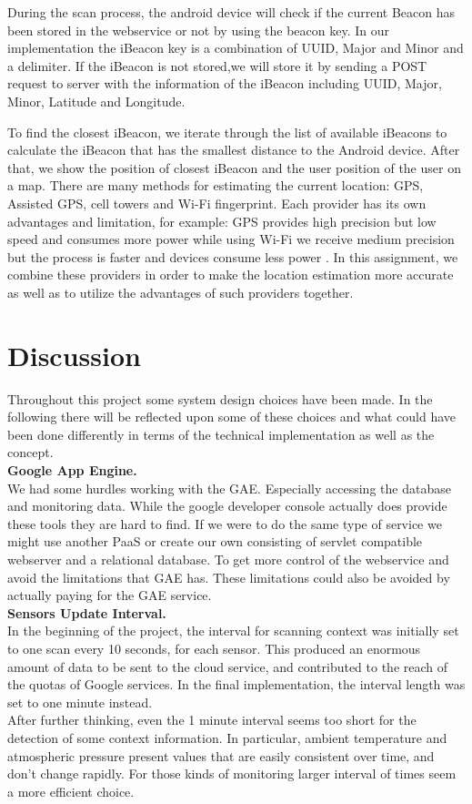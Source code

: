\documentclass{sigchi}
\begin{document}
During the scan process, the android device will check if the current Beacon has been stored in the webservice or not by using the beacon key.
In our implementation the iBeacon key is a combination of UUID, Major and Minor and a delimiter.
If the iBeacon is not stored,we will store it by sending a POST request to server with the information of the iBeacon including UUID, Major, Minor, Latitude and Longitude.

To find the closest iBeacon, we iterate through the list of available iBeacons to calculate the iBeacon that has the smallest distance to the Android device. After that, we show the position of closest iBeacon and the user position of the user on a map.
There are many methods for estimating the current location: GPS, Assisted GPS, cell towers and Wi-Fi fingerprint.
Each provider has its own advantages and limitation, for example: GPS provides high precision but low speed and consumes more power while using Wi-Fi we receive medium precision but the process is faster and devices consume less power \cite{LaMarca:2008:LS, Constandache:2010:TMPLWWD}.
In this assignment, we combine these providers in order to make the location estimation more accurate as well as to utilize the advantages of such providers together. 
\section{Discussion}
Throughout this project some system design choices have
been made. In the following there will be reflected upon some of these choices and 
what could have been done differently in terms of the technical implementation
 as well as the concept.\\

\textbf{Google App Engine. }\\
We had some hurdles working with the GAE. Especially accessing the database and monitoring data. While the google developer console actually does provide these tools they are hard to find. If we were to do the same type of service we might use another PaaS or create our own consisting of servlet compatible webserver and a relational database.
To get more control of the webservice and avoid the limitations that GAE has. These  limitations could also be avoided by actually paying for the GAE service.\\

\textbf{Sensors Update Interval. } \\
In the beginning of the project, the interval for scanning context was initially set to one scan every 10 seconds, for each sensor. This produced an enormous amount of data to be sent to the cloud service, and contributed to the reach of the quotas of Google services.
In the final implementation, the interval length was set to one minute instead.\\ After further thinking, even the 1 minute interval seems too short for the detection of some context information. In particular, ambient temperature and atmospheric pressure present values that are easily consistent over time, and don't change rapidly. For those kinds of monitoring larger interval of times seem a more efficient choice.\\ 
\end{document}
